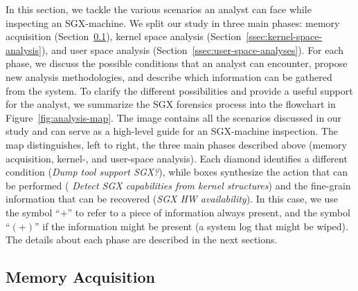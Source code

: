 In this section, we tackle the various scenarios an analyst can face while 
inspecting an SGX-machine.
We split our study in three main phases: memory acquisition 
(Section~\ref{ssec:memory-dump}), kernel space analysis 
(Section~\ref{ssec:kernel-space-analysis}), 
and user space analysis (Section~\ref{ssec:user-space-analyses}).
For each phase, we discuss the possible conditions 
that an analyst can encounter, propose new analysis methodologies, and describe 
which information can be 
gathered from the system.
To clarify the different possibilities and provide a useful support for 
the analyst, we summarize the SGX forensics process into the flowchart in 
Figure~\ref{fig:analysis-map}.
The image contains all the scenarios discussed in our study and can serve
as a high-level guide for an SGX-machine inspection.
The map distinguishes, left to right, the three main phases described above 
(\ie memory 
acquisition, kernel-, and user-space analysis).
Each diamond identifies a different condition (\eg \emph{Dump tool support 
	SGX?}), while boxes synthesize the action that can be performed (\eg 
	\emph{Detect SGX 
	capabilities from kernel structures}) and the  
fine-grain information that can be recovered (\eg \emph{SGX HW 
	availability}). In this case, we use the symbol ``$+$'' to refer to a piece 
	of 
information always present, and the symbol ``$(+)$'' if the information might 
be present
(\eg a system log that might be wiped).
The details about each phase are described in the next sections.

\subsection{Memory Acquisition}
\label{ssec:memory-dump}

